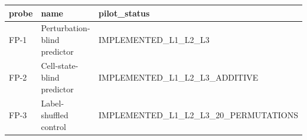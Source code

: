 \begin{tabular}{lll}
\toprule
probe & name & pilot_status \\
\midrule
FP-1 & Perturbation-blind predictor & IMPLEMENTED_L1_L2_L3 \\
FP-2 & Cell-state-blind predictor & IMPLEMENTED_L1_L2_L3_ADDITIVE \\
FP-3 & Label-shuffled control & IMPLEMENTED_L1_L2_L3_20_PERMUTATIONS \\
\bottomrule
\end{tabular}


